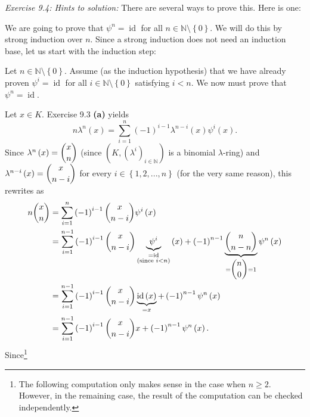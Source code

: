 \documentclass[numbers=enddot,12pt,final,onecolumn,notitlepage]{scrartcl}%
\begin{document}
\textit{Exercise 9.4: Hints to solution:} There are several ways to prove
this. Here is one:

We are going to prove that $\psi^{n}=\operatorname*{id}$ for all
$n\in\mathbb{N}\setminus\left\{  0\right\}  $. We will do this by strong
induction over $n$. Since a strong induction does not need an induction base,
let us start with the induction step:

Let $n\in\mathbb{N}\setminus\left\{  0\right\}  $. Assume (as the induction
hypothesis) that we have already proven $\psi^{i}=\operatorname*{id}$ for all
$i\in\mathbb{N}\setminus\left\{  0\right\}  $ satisfying $i<n$. We now must
prove that $\psi^{n}=\operatorname*{id}$.

Let $x\in K$. Exercise 9.3 \textbf{(a)} yields%
\[
n\lambda^{n}\left(  x\right)  =\sum_{i=1}^{n}\left(  -1\right)  ^{i-1}%
\lambda^{n-i}\left(  x\right)  \psi^{i}\left(  x\right)  .
\]
Since $\lambda^{n}\left(  x\right)  =\dbinom{x}{n}$ (since $\left(  K,\left(
\lambda^{i}\right)  _{i\in\mathbb{N}}\right)  $ is a binomial $\lambda$-ring)
and $\lambda^{n-i}\left(  x\right)  =\dbinom{x}{n-i}$ for every $i\in\left\{
1,2,...,n\right\}  $ (for the very same reason), this rewrites as%
\begin{align*}
n\dbinom{x}{n} &  =\sum_{i=1}^{n}\left(  -1\right)  ^{i-1}\dbinom{x}{n-i}%
\psi^{i}\left(  x\right)  \\
&  =\sum_{i=1}^{n-1}\left(  -1\right)  ^{i-1}\dbinom{x}{n-i}\underbrace{\psi
^{i}}_{\substack{=\operatorname*{id}\\\text{(since }i<n\text{)}}}\left(
x\right)  +\left(  -1\right)  ^{n-1}\underbrace{\dbinom{n}{n-n}}_{=\dbinom
{n}{0}=1}\psi^{n}\left(  x\right)  \\
&  =\sum_{i=1}^{n-1}\left(  -1\right)  ^{i-1}\dbinom{x}{n-i}%
\underbrace{\operatorname*{id}\left(  x\right)  }_{=x}+\left(  -1\right)
^{n-1}\psi^{n}\left(  x\right)  \\
&  =\sum_{i=1}^{n-1}\left(  -1\right)  ^{i-1}\dbinom{x}{n-i}x+\left(
-1\right)  ^{n-1}\psi^{n}\left(  x\right)  .
\end{align*}
Since\footnote{The following computation only makes sense in the case when
$n\geq2$. However, in the remaining case, the result of the computation can be
checked independently.}%
\end{document}
